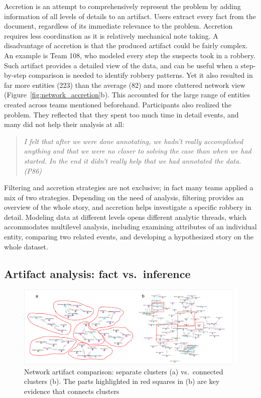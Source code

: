 Accretion is an attempt to comprehensively represent the problem by adding
information of all levels of details to an artifact. Users extract every fact
from the document, regardless of its immediate relevance to the problem.
Accretion requires less coordination as it is relatively mechanical note taking.
A disadvantage of accretion is that the produced artifact could be fairly
complex. An example is Team 108, who modeled every step the suspects took in a
robbery. Such artifact provides a detailed view of the data, and can be useful
when a step-by-step comparison is needed to identify robbery patterns. Yet it
also resulted in far more entities (223) than the average (82) and more
cluttered network view (Figure~\ref{fig:network_accretion}b). This accounted for
the large range of entities created across teams mentioned beforehand.
Participants also realized the problem. They reflected that they spent too much
time in detail events, and many did not help their analysis at all:

\begin{quote}
\emph{I felt that after we were done annotating, we hadn't really accomplished
anything and that we were no closer to solving the case than when we had
started. In the end it didn't really help that we had annotated the
data. (P86)}
\end{quote}

Filtering and accretion strategies are not exclusive; in fact many teams applied a mix of two strategies. Depending on the need of analysis, filtering provides an overview of the whole story, and accretion helps investigate a specific robbery in detail. Modeling data at different levels opens different analytic threads, which accommodates multilevel analysis, including examining attributes of an individual entity, comparing two related events, and developing a hypothesized story on the whole dataset.

\subsection{Artifact analysis: fact
vs.~inference}\label{artifact-construction-fact-vs.inference}

\begin{figure}
\centering
\includegraphics[width=\columnwidth]{img/network_cluster.png}
\caption{Network artifact comparison: separate clusters (a)
vs.~connected clusters (b). The parts highlighted in red squares in (b) are key
evidence that connects clusters\label{fig:network_cluster}}
\end{figure}


